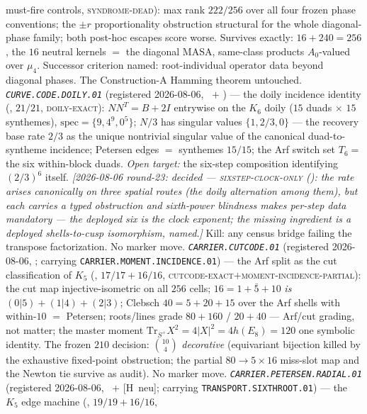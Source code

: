 \documentclass[11pt,a4paper]{article}
\begin{document}
must-fire controls, \textsc{syndrome-dead}): max rank $222/256$
over all four frozen phase conventions; the $\pm r$
proportionality obstruction structural for the whole
diagonal-phase family; both post-hoc escapes score worse.
Survives exactly: $16+240=256$, the $16$ neutral kernels $=$ the
diagonal MASA, same-class products $A_0$-valued over $\mu_4$.
Successor criterion named: root-individual operator data beyond
diagonal phases.  The Construction-A Hamming theorem untouched.
\emph{\texttt{CURVE.CODE.DOILY.01}} (registered 2026-08-06, \mE\
$+$ \mO) --- the doily incidence identity
(, $21/21$,
\textsc{doily-exact}): $NN^{T}=B+2I$ entrywise on the $K_6$ doily
($15$ duads $\times$ $15$ synthemes), $\mathrm{spec}=\{9,4^9,0^5\}$;
$N/3$ has singular values $\{1,2/3,0\}$ --- the recovery base rate
$2/3$ as the unique nontrivial singular value of the canonical
duad-to-syntheme incidence; Petersen edges $=$ synthemes $15/15$;
the Arf switch set $T_6=$ the six within-block duads.  \emph{Open
target:} the six-step composition identifying $(2/3)^6$ itself.
\emph{[2026-08-06 round-23: decided ---
\textsc{sixstep-clock-only}
(): the rate arises
canonically on three spatial routes (the doily alternation among
them), but each carries a typed obstruction and sixth-power
blindness makes per-step data mandatory --- the deployed six is
the clock exponent; the missing ingredient is a deployed
shells-to-cusp isomorphism, named.]}
Kill: any census bridge failing the transpose factorization.  No
marker move.
\emph{\texttt{CARRIER.CUTCODE.01}} (registered 2026-08-06, \mE;
carrying \texttt{CARRIER.MOMENT.INCIDENCE.01}) --- the Arf split
as the cut classification of $K_5$
(, $17/17+16/16$,
\textsc{cutcode-exact}$+$\textsc{moment-incidence-partial}): the
cut map injective-isometric on all $256$ cells;
$16=1+\bar5+10$ \emph{is} $(0|5)+(1|4)+(2|3)$; Clebsch
$40=5+20+15$ over the Arf shells with within-$10$ $=$ Petersen;
roots/lines grade $80+160$ / $20+40$ --- Arf/cut grading, not
matter; the master moment
$\mathrm{Tr}_{S^{+}}X^2=4|X|^2=4h(E_8)=120$ one symbolic
identity.  The frozen $210$ decision: $\binom{10}{4}$
\emph{decorative} (equivariant bijection killed by the exhaustive
fixed-point obstruction; the partial $80\to5\times16$ miss-slot
map and the Newton tie survive as audit).  No marker move.
\emph{\texttt{CARRIER.PETERSEN.RADIAL.01}} (registered 2026-08-06,
\mE\ $+$ [H~neu]; carrying \texttt{TRANSPORT.SIXTHROOT.01}) ---
the $K_5$ edge machine
(, $19/19+16/16$,
\end{document}
